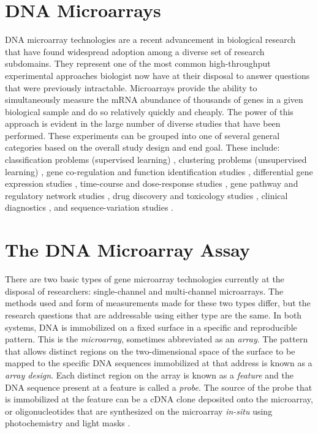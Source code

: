 \section{DNA Microarrays}

DNA microarray technologies are a recent advancement in biological research
that have found widespread adoption among a diverse set of research subdomains.
They represent one of the most common high-throughput experimental approaches
biologist now have at their disposal to answer questions that were previously
intractable. Microarrays provide the ability to simultaneously measure the mRNA
abundance of thousands of genes in a given biological sample and do so
relatively quickly and cheaply.  The power of this approach is evident in the
large number of diverse studies that have been performed.  These experiments
can be grouped into one of several general categories based on the overall
study design and end goal.  These include: classification problems (supervised
learning) \cite{Dudoit2003ICM}, clustering problems (unsupervised learning)
\cite{Azuaje2003cge,Stanford2003cac}, gene co-regulation and function
identification studies \cite{PMID_12413821}, differential gene expression
studies \cite{PMID_15843092,PMID_15867208}, time-course and dose-response
studies \cite{PMID_12443997}, gene pathway and regulatory network studies
\cite{PMID_16216773,PMID_16825123}, drug discovery and toxicology studies
\cite{PMID_16512775,PMID_16700885,PMID_16880944,PMID_17195470}, clinical
diagnostics \cite{PMID_16918486}, and sequence-variation studies
\cite{PMID_17265721}.

\section{The DNA Microarray Assay}

There are two basic types of gene microarray technologies currently at the
disposal of researchers: single-channel and multi-channel microarrays.  The
methods used and form of measurements made for these two types differ, but the
research questions that are addressable using either type are the same.  In
both systems, DNA is immobilized on a fixed surface in a specific and
reproducible pattern.  This is the \emph{microarray}, sometimes abbreviated as
an \emph{array}.  The pattern that allows distinct regions on the
two-dimensional space of the surface to be mapped to the specific DNA sequences
immobilized at that address is known as a \emph{array design}.  Each distinct
region on the array is known as a \emph{feature} and the DNA sequence present
at a feature is called a \emph{probe}.  The source of the probe that is
immobilized at the feature can be a cDNA clone deposited onto the microarray,
or oligonucleotides that are synthesized on the microarray \emph{in-situ} using
photochemistry and light masks \cite{XXX}.

